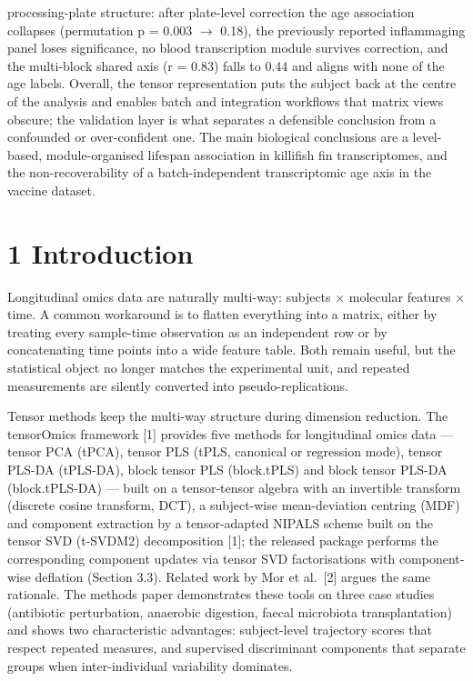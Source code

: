 \documentclass[
]{article}
\newcounter{none} %
\begin{document}
processing-plate structure: after plate-level correction the age
association collapses (permutation p = 0.003 \(\to\) 0.18), the
previously reported inflammaging panel loses significance, no blood
transcription module survives correction, and the multi-block shared
axis (r = 0.83) falls to 0.44 and aligns with none of the age labels.
Overall, the tensor representation puts the subject back at the centre
of the analysis and enables batch and integration workflows that matrix
views obscure; the validation layer is what separates a defensible
conclusion from a confounded or over-confident one. The main biological
conclusions are a level-based, module-organised lifespan association in
killifish fin transcriptomes, and the non-recoverability of a
batch-independent transcriptomic age axis in the vaccine dataset.

\section{1 Introduction}\label{introduction}

Longitudinal omics data are naturally multi-way: subjects \(\times\)
molecular features \(\times\) time. A common workaround is to flatten
everything into a matrix, either by treating every sample-time
observation as an independent row or by concatenating time points into a
wide feature table. Both remain useful, but the statistical object no
longer matches the experimental unit, and repeated measurements are
silently converted into pseudo-replications.

Tensor methods keep the multi-way structure during dimension reduction.
The tensorOmics framework {[}1{]} provides five methods for longitudinal
omics data --- tensor PCA (tPCA), tensor PLS (tPLS, canonical or
regression mode), tensor PLS-DA (tPLS-DA), block tensor PLS (block.tPLS)
and block tensor PLS-DA (block.tPLS-DA) --- built on a tensor-tensor
algebra with an invertible transform (discrete cosine transform, DCT), a
subject-wise mean-deviation centring (MDF) and component extraction by a
tensor-adapted NIPALS scheme built on the tensor SVD (t-SVDM2)
decomposition {[}1{]}; the released package performs the corresponding
component updates via tensor SVD factorisations with component-wise
deflation (Section 3.3). Related work by Mor et al.~{[}2{]} argues the
same rationale. The methods paper demonstrates these tools on three case
studies (antibiotic perturbation, anaerobic digestion, faecal microbiota
transplantation) and shows two characteristic advantages: subject-level
trajectory scores that respect repeated measures, and supervised
discriminant components that separate groups when inter-individual
variability dominates.
\end{document}
